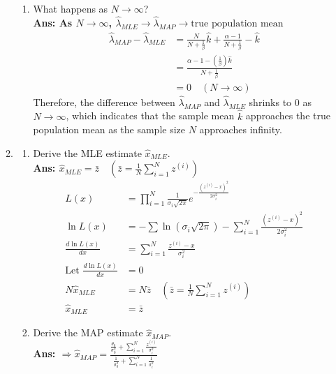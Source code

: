 \documentclass{article}
\theoremstyle{definition}
\theoremstyle{remark}
\begin{document}
\begin{enumerate}[font={\Large\bfseries},left=0pt]
\begin{tcolorbox}
\begin{enumerate}
\begin{enumerate}
        \item What happens as $N \rightarrow  \infty$? \\
        \textbf{Ans: As $N \rightarrow \infty$, $\hat{\lambda}_{MLE} \rightarrow \hat{\lambda}_{MAP} \rightarrow \text{true population mean}$}
        \begin{align}
            \hat{\lambda}_{MAP} - \hat{\lambda}_{MLE} &= \frac{N}{N + \frac{1}{\beta}}\hat{k} + \frac{\alpha - 1}{N + \frac{1}{\beta}} - \hat{k} \\
            &= \frac{\alpha - 1 - (\frac{1}{\beta})\hat{k}}{N + \frac{1}{\beta}} \\
            &= 0 \quad (N \rightarrow \infty) 
        \end{align}
        Therefore, the difference between $\hat{\lambda}_{MAP}$ and $\hat{\lambda}_{MLE}$ shrinks to $0$ as $N \rightarrow \infty$, which indicates that the sample mean $\hat{k}$ approaches the true population mean as the sample size $N$ approaches infinity.
    \end{enumerate}
    \item \begin{enumerate}
        \item Derive the MLE estimate $\hat{x}_{MLE}.$ \\
        \textbf{Ans: $\hat{x}_{MLE} = \bar{z} \quad (\bar{z} = \frac{1}{N} \sum^N_{i=1} z^{(i)})$}
        \begin{align}
        L(x) &= \prod^{N}_{i =1} \frac{1}{\sigma_i\sqrt{2\pi}} e^{-\frac{(z^{(i)} - x)^2}{2\sigma_i^2}} \\
        \ln L(x) &= -\sum \ln (\sigma_i\sqrt{2\pi}) - \sum^N_{i =1}\frac{(z^{(i)} - x)^2}{2\sigma_i^2} \\
        \frac{d \ln L(x)}{dx} &=  \sum^N_{i =1}\frac{z^{(i)} - x}{\sigma_i^2} \\
        \text{Let } \frac{d \ln L(x)}{dx} &= 0 \\
        N\hat{x}_{MLE} &= N\bar{z} \quad (\bar{z} = \frac{1}{N} \sum^N_{i=1} z^{(i)}) \\
        \hat{x}_{MLE} &= \bar{z}
        \end{align}
        
        \item Derive the MAP estimate $\hat{x}_{MAP}.$ \\
        \textbf{Ans: $\Rightarrow \hat{x}_{MAP} = \frac{\frac{\theta_0}{\sigma^2_0} + \sum^N_{i = 1} \frac{z^{(i)}}{\sigma^2_i}}{\frac{1}{\sigma_0^2} + \sum^N_{i=1} \frac{1}{\sigma^2_i}}$} \\
        

\end{enumerate}
\end{enumerate}
\end{tcolorbox}
\end{enumerate}
\end{document}
